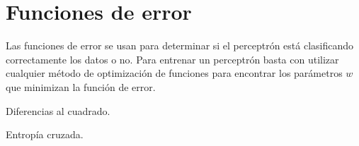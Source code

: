 \section{Funciones de error}

Las funciones de error se usan para determinar si el perceptrón está clasificando correctamente los datos o no.
Para entrenar un perceptrón basta con utilizar cualquier método de optimización de funciones para encontrar los parámetros $w$ que minimizan la función de error.

\begin{description}
 \item Diferencias al cuadrado.
 \item Entropía cruzada.
\end{description}
